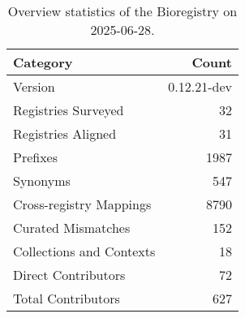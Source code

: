 \begin{table}
\caption{Overview statistics of the Bioregistry on 2025-06-28.}
\label{tab:bioregistry-summary}
\begin{tabular}{lr}
\toprule
Category & Count \\
\midrule
Version & 0.12.21-dev \\
Registries Surveyed & 32 \\
Registries Aligned & 31 \\
Prefixes & 1987 \\
Synonyms & 547 \\
Cross-registry Mappings & 8790 \\
Curated Mismatches & 152 \\
Collections and Contexts & 18 \\
Direct Contributors & 72 \\
Total Contributors & 627 \\
\bottomrule
\end{tabular}
\end{table}
